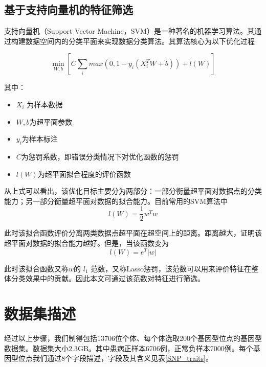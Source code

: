 \subsection{ 基于支持向量机的特征筛选}

支持向量机（Support Vector
Machine，SVM）是一种著名的机器学习算法。其通过构建数据空间内的分类平面来实现数据分类算法。其算法核心为以下优化过程

\begin{equation}
    \min_{W,b} [C\sum_{i}max(0,1-y_i(X_i^TW+b))+l(W)]
\end{equation}

其中：

\begin{itemize}
\item
  \(X_i\) 为样本数据
\item
  \(W,b\)为超平面参数
\item
  \(y_i\)为样本标注
\item
  \(C\)为惩罚系数，即错误分类情况下对优化函数的惩罚
\item
  \(l(W)\)为超平面拟合程度的评价函数
\end{itemize}

从上式可以看出，该优化目标主要分为两部分：一部分衡量超平面对数据点的分类能力；另一部分衡量超平面对数据的拟合能力。目前常用的SVM算法中
\begin{equation}
    l(W)=\frac{1}{2}w^Tw
\end{equation}


此时该拟合函数评价分离两类数据点超平面在超空间上的距离。距离越大，证明该超平面对数据的拟合能力越好。但是，当该函数变为
\begin{equation}
    l(W)=e^T|w|
\end{equation}


此时该拟合函数又称$w$的 $l_1$
范数，又称Lasso惩罚\cite{tibshirani_regression_1996}，该范数可以用来评价特征在整体分类效果中的贡献\cite{fung_feature_2004}。因此本文可通过该范数对特征进行筛选。

\section{数据集描述}
经过以上步骤，我们制得包括13706位个体、每个体选取200个基因型位点的基因型数据集。数据集大小2.3GB。其中患病正样本6706例，正常负样本7000例。每个基因型位点我们通过8个字段描述，字段及其含义见表\ref{SNP_traits}。


